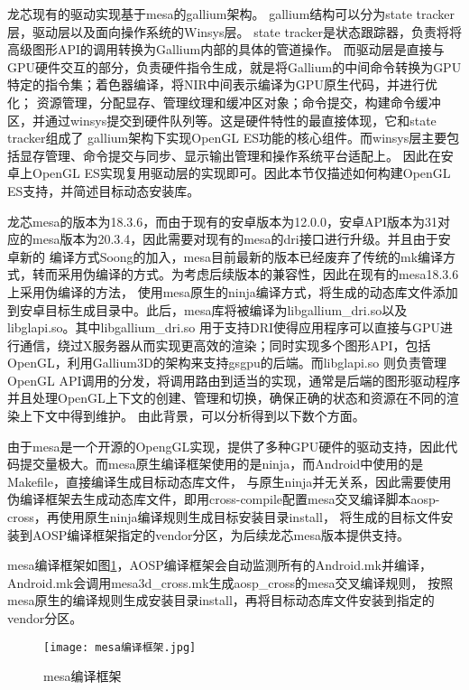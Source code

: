 龙芯现有的驱动实现基于mesa的gallium架构。
gallium结构可以分为state tracker层，驱动层以及面向操作系统的Winsys层。
state tracker是状态跟踪器，负责将将高级图形API的调用转换为Gallium内部的具体的管道操作。
而驱动层是直接与GPU硬件交互的部分，负责硬件指令生成，就是将Gallium的中间命令转换为GPU特定的指令集；着色器编译，将NIR中间表示编译为GPU原生代码，并进行优化；
资源管理，分配显存、管理纹理和缓冲区对象；命令提交，构建命令缓冲区，并通过winsys提交到硬件队列等。这是硬件特性的最直接体现，它和state tracker组成了
gallium架构下实现OpenGL ES功能的核心组件。而winsys层主要包括显存管理、命令提交与同步、显示输出管理和操作系统平台适配上。
因此在安卓上OpenGL ES实现复用驱动层的实现即可。因此本节仅描述如何构建OpenGL ES支持，并简述目标动态安装库。

龙芯mesa的版本为18.3.6，而由于现有的安卓版本为12.0.0，安卓API版本为31对应的mesa版本为20.3.4，因此需要对现有的mesa的dri接口进行升级。并且由于安卓新的
编译方式Soong的加入，mesa目前最新的版本已经废弃了传统的mk编译方式，转而采用伪编译的方式。为考虑后续版本的兼容性，因此在现有的mesa18.3.6上采用伪编译的方法，
使用mesa原生的ninja编译方式，将生成的动态库文件添加到安卓目标生成目录中。此后，mesa库将被编译为libgallium\_dri.so以及libglapi.so。其中libgallium\_dri.so
用于支持DRI使得应用程序可以直接与GPU进行通信，绕过X服务器从而实现更高效的渲染；同时实现多个图形API，包括OpenGL，利用Gallium3D的架构来支持gsgpu的后端。而libglapi.so
则负责管理OpenGL API调用的分发，将调用路由到适当的实现，通常是后端的图形驱动程序并且处理OpenGL上下文的创建、管理和切换，确保正确的状态和资源在不同的渲染上下文中得到维护。
由此背景，可以分析得到以下数个方面。

由于mesa是一个开源的OpengGL实现，提供了多种GPU硬件的驱动支持，因此代码提交量极大。而mesa原生编译框架使用的是ninja，而Android中使用的是Makefile，直接编译生成目标动态库文件，
与原生ninja并无关系，因此需要使用伪编译框架去生成动态库文件，即用cross-compile配置mesa交叉编译脚本aosp-cross，再使用原生ninja编译规则生成目标安装目录install，
将生成的目标文件安装到AOSP编译框架指定的vendor分区，为后续龙芯mesa版本提供支持。

mesa编译框架如图\ref{fig:mesa编译框架}，AOSP编译框架会自动监测所有的Android.mk并编译，Android.mk会调用mesa3d\_cross.mk生成aosp\_cross的mesa交叉编译规则，
按照mesa原生的编译规则生成安装目录install，再将目标动态库文件安装到指定的vendor分区。
\begin{figure}[h]
  \centering
  \texttt{[image: mesa编译框架.jpg]}
  \caption{mesa编译框架}
  \label{fig:mesa编译框架}
\end{figure}

